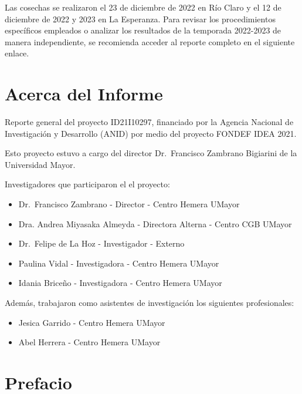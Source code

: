 \documentclass[
  letterpaper,
  DIV=11,
  numbers=noendperiod]{scrreprt}
\providecommand{\tightlist}{%
  \setlength{\itemsep}{0pt}\setlength{\parskip}{0pt}}\usepackage{longtable,booktabs,array}
\begin{document}
Las cosechas se realizaron el 23 de diciembre de 2022 en Río Claro y el
12 de diciembre de 2022 y 2023 en La Esperanza. Para revisar los
procedimientos específicos empleados o analizar los resultados de la
temporada 2022-2023 de manera independiente, se recomienda acceder al
reporte completo en el siguiente enlace.


\chapter*{Acerca del Informe}\label{acerca-del-informe-1}


Reporte general del proyecto ID21I10297, financiado por la Agencia
Nacional de Investigación y Desarrollo (ANID) por medio del proyecto
FONDEF IDEA 2021.

Esto proyecto estuvo a cargo del director Dr.~Francisco Zambrano
Bigiarini de la Universidad Mayor.

Investigadores que participaron el el proyecto:

\begin{itemize}
\tightlist
\item
  Dr.~Francisco Zambrano - Director - Centro Hemera UMayor
\item
  Dra. Andrea Miyasaka Almeyda - Directora Alterna - Centro CGB UMayor
\item
  Dr.~Felipe de La Hoz - Investigador - Externo
\item
  Paulina Vidal - Investigadora - Centro Hemera UMayor
\item
  Idania Briceño - Investigadora - Centro Hemera UMayor
\end{itemize}

Además, trabajaron como asistentes de investigación los siguientes
profesionales:

\begin{itemize}
\tightlist
\item
  Jesica Garrido - Centro Hemera UMayor
\item
  Abel Herrera - Centro Hemera UMayor
\end{itemize}


\chapter*{Prefacio}\label{prefacio}
\end{document}
